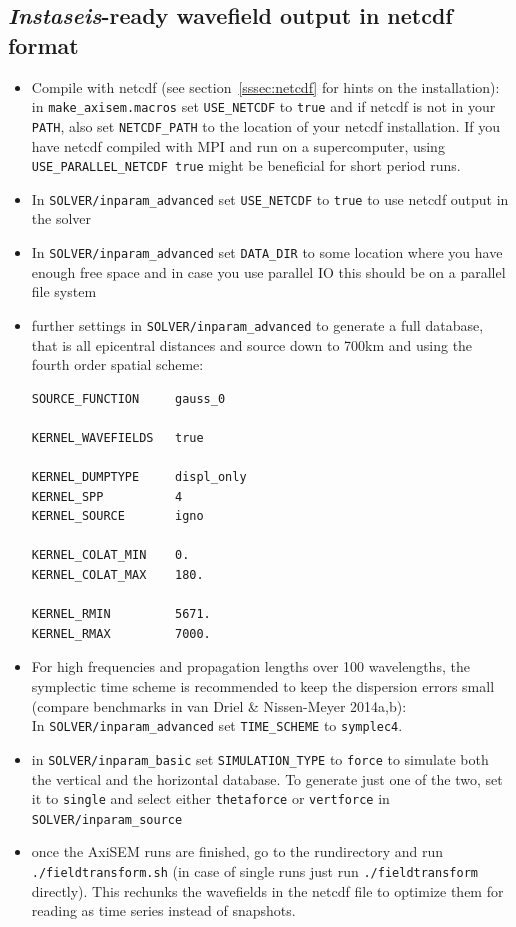 \documentclass{article}
\begin{document}
\subsection{\textit{Instaseis}-ready wavefield output in netcdf format}

\begin{itemize}
    \item Compile with netcdf (see section~\ref{sssec:netcdf} for hints on the
    installation): in \verb|make_axisem.macros| set \verb|USE_NETCDF| to \verb|true|
    and if netcdf is not in your \verb|PATH|, also set \verb|NETCDF_PATH| to the location
    of your netcdf installation. If you have netcdf compiled with MPI and run on a
    supercomputer, using \verb|USE_PARALLEL_NETCDF true| might be beneficial for short
    period runs.
    \item In \verb|SOLVER/inparam_advanced| set \verb|USE_NETCDF| to \verb|true| to
    use netcdf output in the solver
    \item In \verb|SOLVER/inparam_advanced| set \verb|DATA_DIR| to some location where you
    have enough free space and in case you use parallel IO this should be on a parallel
    file system
    \item further settings in \verb|SOLVER/inparam_advanced| to generate a full database,
    that is all epicentral distances and source down to 700km and using the fourth order
    spatial scheme:

\begin{verbatim}
SOURCE_FUNCTION     gauss_0

KERNEL_WAVEFIELDS   true

KERNEL_DUMPTYPE     displ_only
KERNEL_SPP          4
KERNEL_SOURCE       igno

KERNEL_COLAT_MIN    0.
KERNEL_COLAT_MAX    180.

KERNEL_RMIN         5671.
KERNEL_RMAX         7000.
\end{verbatim}


    \item For high frequencies and propagation lengths over 100 wavelengths, the 
    symplectic time scheme is recommended to keep the dispersion errors small 
    (compare benchmarks in van Driel \& Nissen-Meyer 2014a,b):\\
    In \verb|SOLVER/inparam_advanced| set \verb|TIME_SCHEME| to \verb|symplec4|. 

    \item in \verb|SOLVER/inparam_basic| set \verb|SIMULATION_TYPE| to \verb|force| to
    simulate both the vertical and the horizontal database. To generate just one of the
    two, set it to \verb|single| and select either \verb|thetaforce| or \verb|vertforce|
    in \\\verb|SOLVER/inparam_source|

    \item once the AxiSEM runs are finished, go to the rundirectory and run
    \verb|./fieldtransform.sh| (in case of single runs just run \verb|./fieldtransform|
    directly). This rechunks the wavefields in the netcdf file to optimize them for
    reading as time series instead of snapshots.

\end{itemize}
\end{document}
